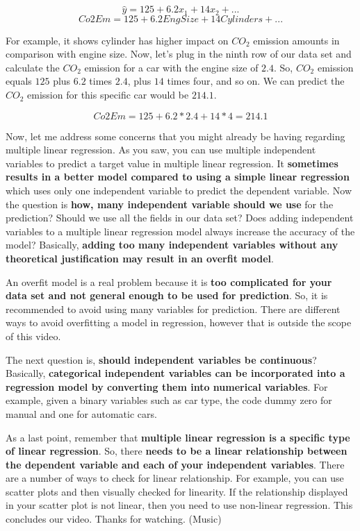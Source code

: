 	\begin{equation}
		\hat{y} = 125 + 6.2x_{1} + 14x_{2} + ...
	\end{equation}
	\begin{equation}
	Co2Em = 125 + 6.2EngSize + 14Cylinders + ...
	\end{equation}
	
	For example, it shows cylinder has higher impact on $CO_2$ emission amounts in comparison with engine size. Now, let's plug in the ninth row of our data set and calculate the $CO_2$ emission for a car with the engine size of $2.4$. So, $CO_2$ emission equals $125$ plus $6.2$ times $2.4$, plus $14$ times four, and so on. We can predict the $CO_2$ emission for this specific car would be $214.1$. 
	
	\begin{equation}
		Co2Em = 125 + 6.2*2.4 + 14*4 = 214.1
	\end{equation}
	
	Now, let me address some concerns that you might already be having regarding multiple linear regression. As you saw, you can use multiple independent variables to predict a target value in multiple linear regression. It \textbf{sometimes results in a better model compared to using a simple linear regression} which uses only one independent variable to predict the dependent variable. Now the question is \textbf{how, many independent variable should we use} for the prediction? Should we use all the fields in our data set? Does adding independent variables to a multiple linear regression model always increase the accuracy of the model? Basically, \textbf{adding too many independent variables without any theoretical justification may result in an overfit model}.
	
	An overfit model is a real problem because it is \textbf{too complicated for your data set and not general enough to be used for prediction}. So, it is recommended to avoid using many variables for prediction. There are different ways to avoid overfitting a model in regression, however that is outside the scope of this video. 
	
	The next question is, \textbf{should independent variables be continuous}? Basically, \textbf{categorical independent variables can be incorporated into a regression model by converting them into numerical variables}. For example, given a binary variables such as car type, the code dummy zero for manual and one for automatic cars. 
	
	As a last point, remember that \textbf{multiple linear regression is a specific type of linear regression}. So, there \textbf{needs to be a linear relationship between the dependent variable and each of your independent variables}. There are a number of ways to check for linear relationship. For example, you can use scatter plots and then visually checked for linearity. If the relationship displayed in your scatter plot is not linear, then you need to use non-linear regression. This concludes our video. Thanks for watching. (Music)

